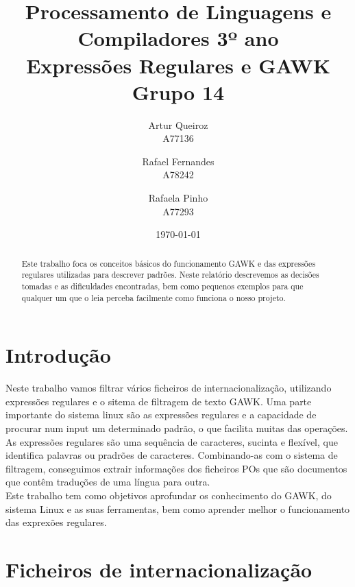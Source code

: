 \documentclass{report}
\title{Processamento de Linguagens e Compiladores 3º ano\\ \textbf{Expressões Regulares e GAWK}\\ Grupo 14}
\author{Artur Queiroz\\ A77136 \and  Rafael Fernandes\\ A78242 \and Rafaela Pinho\\ A77293 }
\date{\today}
\begin{document}
\maketitle

\begin{abstract}
Este trabalho foca os conceitos básicos do funcionamento GAWK e das expressões regulares utilizadas para descrever padrões.
Neste relatório descrevemos as decisões tomadas e as dificuldades encontradas, bem como pequenos exemplos para que qualquer um que o leia perceba facilmente como funciona o nosso projeto.
\end{abstract}

\tableofcontents

\chapter{Introdução} \label{intro}
Neste trabalho vamos filtrar vários ficheiros de internacionalização, utilizando expressões regulares e o sitema de filtragem de texto GAWK. Uma parte importante do sistema linux são as expressões regulares e a capacidade de procurar num input um determinado padrão, o que facilita muitas das operações.\\
As expressões regulares são uma sequência de caracteres, sucinta e flexível, que identifica palavras ou pradrões de caracteres. Combinando-as com o sistema de filtragem, conseguimos extrair informações dos ficheiros POs que são documentos que contêm traduções de uma língua para outra.\\
Este trabalho tem como objetivos aprofundar os conhecimento do GAWK, do sistema Linux e as suas ferramentas, bem como aprender melhor o funcionamento das exprexões regulares.


\chapter{Ficheiros de internacionalização} \label{fi}
\end{document}
